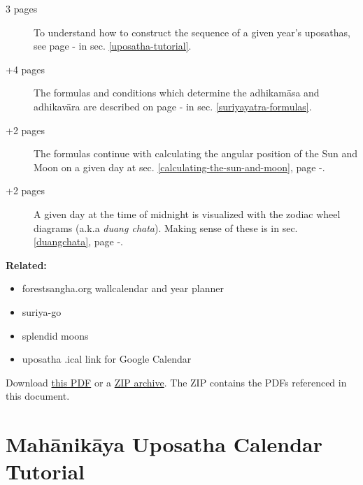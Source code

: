 \documentclass[11pt,oneside]{memoir-article}
\begin{document}
\begin{description}
\item[{3 pages}] To understand how to construct the sequence of a given year's uposathas, see
page \pageref{uposatha-tutorial}-\pageref{uposatha-tutorial-end}
in sec. \ref{uposatha-tutorial}.
\item[{+4 pages}] The formulas and conditions which determine the adhikamāsa and
adhikavāra are described on page \pageref{suriyayatra-formulas}-\pageref{adhikavara-years-end} in
sec. \ref{suriyayatra-formulas}.
\item[{+2 pages}] The formulas continue with calculating the angular position
of the Sun and Moon on a given day at sec. \ref{calculating-the-sun-and-moon}, page
\pageref{calculating-the-sun-and-moon}-\pageref{calculating-the-sun-and-moon-end}.
\item[{+2 pages}] A given day at the time of midnight is visualized with the zodiac
wheel diagrams (a.k.a \emph{duang chata}). Making sense of these is in sec. \ref{duangchata},
page \pageref{duangchata}-\pageref{duangchata-end}.
\end{description}

{\centering\large\bfseries
Related:
\par}

\begin{itemize}
\item forestsangha.org wallcalendar and year planner
\item suriya-go
\item splendid moons
\item uposatha .ical link for Google Calendar
\end{itemize}

Download \href{https://github.com/profound-labs/calculating-the-uposatha-moondays/raw/master/calculating-the-uposatha-moondays.pdf}{this PDF} or a \href{https://github.com/profound-labs/calculating-the-uposatha-moondays/archive/master.zip}{ZIP archive}. The ZIP contains the PDFs referenced in this document.

%
%

\clearpage

\chapter{Mahānikāya Uposatha Calendar Tutorial}
\label{sec-1}
\label{uposatha-tutorial}
\end{document}

